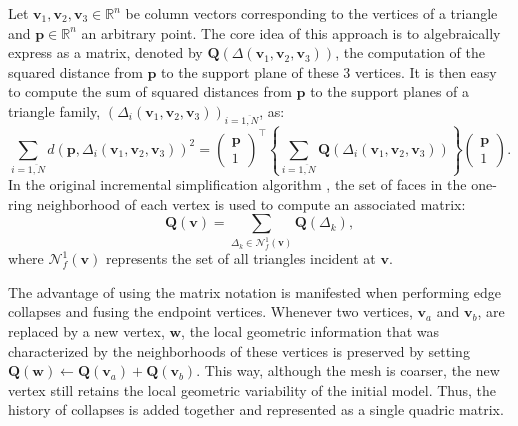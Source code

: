 \documentclass[graybox]{svmult}
\begin{document}
Let $\mathbf{v}_1, \mathbf{v}_2, \mathbf{v}_3 \in \mathbb{R}^n$ be column vectors corresponding to the vertices of a triangle and $\mathbf{p} \in \mathbb{R}^n$  an arbitrary point.
The core idea of this approach is to algebraically express as a matrix, denoted by $\mathbf{Q}(\Delta(\mathbf{v}_1, \mathbf{v}_2, \mathbf{v}_3))$, the computation of the squared distance from  $\mathbf{p}$ to the support plane of these 3 vertices. It is then easy to compute the sum of squared distances from $\mathbf{p}$ to  the support planes of a triangle family, $\left( \Delta_i(\mathbf{v}_{1}, \mathbf{v}_{2}, \mathbf{v}_{3}) \right)_{i=\overline{1,N}}$, as:
\begin{equation}
\sum\limits_{i=\overline{1,N}}{d(\mathbf{p},  \Delta_i(\mathbf{v}_{1}, \mathbf{v}_{2}, \mathbf{v}_{3}) )^2 } = 
\begin{pmatrix} \mathbf{p} \\ 1 \end{pmatrix}^\intercal \left\{  \sum\limits_{i=\overline{1,N}} \mathbf{Q}\left(  \Delta_i(\mathbf{v}_{1}, \mathbf{v}_{2}, \mathbf{v}_{3}) \right) \right\} \begin{pmatrix} \mathbf{p} \\ 1 \end{pmatrix}.
\label{eq_cds:quadric_addition}
\end{equation}
In the original incremental simplification algorithm \cite{Garland1998}, the set of faces in the one-ring neighborhood of each vertex is used to compute an associated matrix:
\begin{equation}
\mathbf{Q(v)} = \sum\limits_{\Delta_k \in \mathcal{N}_f^1(\mathbf{v})}{ \mathbf{Q}(\Delta_k) },
\label{eq_cds:vertex_quadric_error_matrix}
\end{equation} 
where $\mathcal{N}_f^1(\mathbf{v})$ represents the set of all triangles incident at $\mathbf{v}$.

The advantage of using the matrix notation is manifested when performing edge collapses and fusing the endpoint vertices. Whenever two vertices, $\mathbf{v}_a$ and $\mathbf{v}_b$, are replaced by a new vertex, $\mathbf{w}$, the local geometric information that was characterized by the neighborhoods of these vertices is preserved by setting $\mathbf{Q}(\mathbf{w}) \leftarrow \mathbf{Q}(\mathbf{v}_a) + \mathbf{Q}(\mathbf{v}_b)$. This way, although the mesh is coarser, the new vertex still retains the local geometric variability of the initial model. Thus, the history of collapses is added together and represented as a single quadric matrix. 
\end{document}
